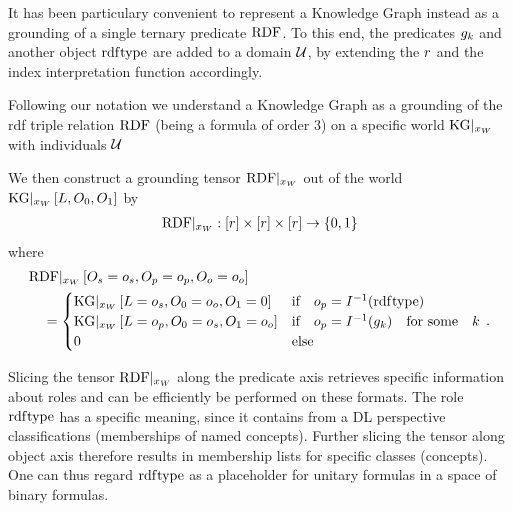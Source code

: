 It has been particulary convenient to represent a Knowledge Graph instead as a grounding of a single ternary predicate $\mathrm{RDF}$.
To this end, the predicates $g_{k}$ and another object $\mathrm{rdf}\mathrm{type}$ are added to a domain $\mathcal{U}$, by extending the $r$ and the index interpretation function accordingly.


Following our notation we understand a Knowledge Graph as a grounding of the rdf triple relation $\mathrm{RDF}$ (being a formula of order 3) on a specific world $\mathrm{KG}|_{x_{W}}$ with individuals $\mathcal{U}$

We then construct a grounding tensor ${\mathrm{RDF}}|_{x_{W}}$ out of the world $\mathrm{KG}|_{x_{W}}\left[L,O_{0},O_{1}\right]$ by
\begin{align*}
    {\mathrm{RDF}}|_{x_{W}} : [r] \times [r] \times [r] \rightarrow \{0,1\}
\end{align*}
where
\begin{align*}
    &{\mathrm{RDF}}|_{x_{W}}\left[O_{s}=o_{s}, O_{p}=o_{p}, O_{o}=o_{o}\right] \\
    &\quad =
    \begin{cases}
        \mathrm{KG}|_{x_{W}}\left[L=o_{s},O_{0}=o_{o},O_{1}=0\right]
        & \text{if} \quad o_{p} = I^{-1}(\mathrm{rdf}\mathrm{type}) \\
        \mathrm{KG}|_{x_{W}}\left[L=o_{p},O_{0}=o_{s},O_{1}=o_{o}\right]
        & \text{if} \quad o_{p} = I^{-1}(g_{k}) \quad \text{for some} \quad k \\
        0  \quad & \text{else}
    \end{cases} \, .
\end{align*}


Slicing the tensor ${\mathrm{RDF}}|_{x_{W}}$ along the predicate axis retrieves specific information about roles and can be efficiently be performed on these formats.
The role $\mathrm{rdf}\mathrm{type}$ has a specific meaning, since it contains from a DL perspective classifications (memberships of named concepts).
Further slicing the tensor along object axis therefore results in membership lists for specific classes (concepts).
One can thus regard $\mathrm{rdf}\mathrm{type}$ as a placeholder for unitary formulas in a space of binary formulas.

